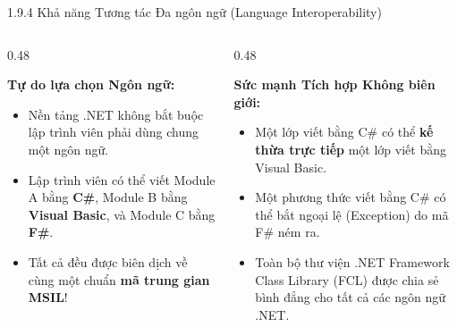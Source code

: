 \documentclass[aspectratio=169, 10pt]{beamer}
\begin{document}
\begin{frame}{1.9.4 Khả năng Tương tác Đa ngôn ngữ (Language Interoperability)}
  \begin{columns}[c]
    \begin{column}{0.48\textwidth}
      \begin{block}{\textbf{Tự do lựa chọn Ngôn ngữ:}}
        \begin{itemize}
          \item Nền tảng .NET không bắt buộc lập trình viên phải dùng chung một ngôn ngữ.
          \item Lập trình viên có thể viết Module A bằng \textbf{C\#}, Module B bằng \textbf{Visual Basic}, và Module C bằng \textbf{F\#}.
          \item Tất cả đều được biên dịch về cùng một chuẩn \textbf{mã trung gian MSIL}!
        \end{itemize}
      \end{block}
    \end{column}
    \begin{column}{0.48\textwidth}
      \begin{exampleblock}{\textbf{Sức mạnh Tích hợp Không biên giới:}}
        \begin{itemize}
          \item Một lớp viết bằng C\# có thể \textbf{kế thừa trực tiếp} một lớp viết bằng Visual Basic.
          \item Một phương thức viết bằng C\# có thể bắt ngoại lệ (Exception) do mã F\# ném ra.
          \item Toàn bộ thư viện .NET Framework Class Library (FCL) được chia sẻ bình đẳng cho tất cả các ngôn ngữ .NET.
        \end{itemize}
      \end{exampleblock}
    \end{column}
  \end{columns}
\end{frame}
\end{document}
